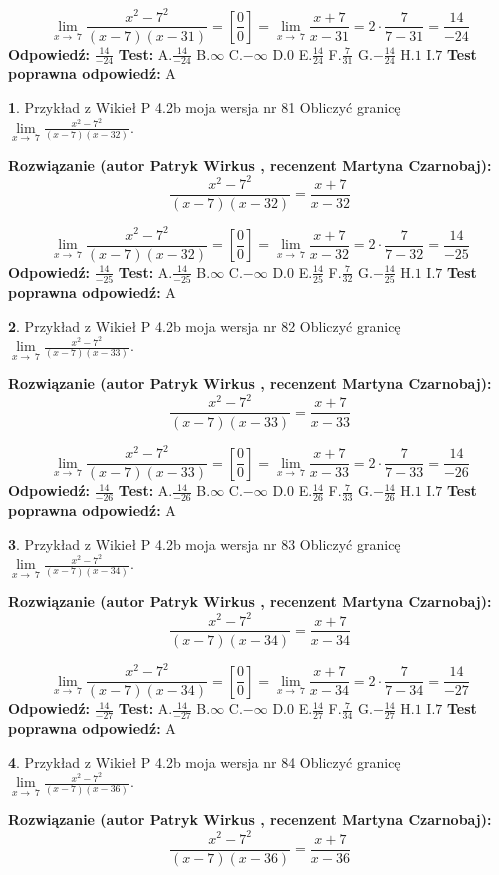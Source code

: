 \documentclass[12pt, a4paper]{article}
\theoremstyle{definition} %
\newtheorem{zad}{}
\newcommand{\zadStart}[1]{\begin{zad}#1\newline}
\newcommand{\zadStop}{\end{zad}}
\newcommand{\rozwStart}[2]{\noindent \textbf{Rozwiązanie (autor #1 , recenzent #2): }\newline}
\newcommand{\rozwStop}{\newline}
\newcommand{\odpStart}{\noindent \textbf{Odpowiedź:}\newline}
\newcommand{\odpStop}{\newline}
\newcommand{\testStart}{\noindent \textbf{Test:}\newline}
\newcommand{\testStop}{\newline}
\newcommand{\kluczStart}{\noindent \textbf{Test poprawna odpowiedź:}\newline}
\newcommand{\kluczStop}{\newline}
\begin{document}
$$\lim\limits_{x\to\ 7}\frac{x^{2}-7^{2}}{(x-7)(x-31)}=[\frac{0}{0}]=\lim\limits_{x\to\ 7}\frac{x+7}{x-31}=2 \cdot \frac{7}{7-31} = \frac{14}{-24}$$
\rozwStop
\odpStart
$\frac{14}{-24}$
\odpStop
\testStart
A.$\frac{14}{-24}$
B.$\infty$
C.$-\infty$
D.$0$
E.$\frac{14}{24}$
F.$\frac{7}{31}$
G.$-\frac{14}{24}$
H.$1$
I.$7$
\testStop
\kluczStart
A
\kluczStop



\zadStart{Przykład z Wikieł P 4.2b moja wersja nr 81}
Obliczyć granicę $\lim\limits_{x\to\ 7}\frac{x^{2}-7^{2}}{(x-7)(x-32)}$.
\zadStop
\rozwStart{Patryk Wirkus}{Martyna Czarnobaj}
$$\frac{x^{2}-7^{2}}{(x-7)(x-32)}=\frac{x+7}{x-32}$$

$$\lim\limits_{x\to\ 7}\frac{x^{2}-7^{2}}{(x-7)(x-32)}=[\frac{0}{0}]=\lim\limits_{x\to\ 7}\frac{x+7}{x-32}=2 \cdot \frac{7}{7-32} = \frac{14}{-25}$$
\rozwStop
\odpStart
$\frac{14}{-25}$
\odpStop
\testStart
A.$\frac{14}{-25}$
B.$\infty$
C.$-\infty$
D.$0$
E.$\frac{14}{25}$
F.$\frac{7}{32}$
G.$-\frac{14}{25}$
H.$1$
I.$7$
\testStop
\kluczStart
A
\kluczStop



\zadStart{Przykład z Wikieł P 4.2b moja wersja nr 82}
Obliczyć granicę $\lim\limits_{x\to\ 7}\frac{x^{2}-7^{2}}{(x-7)(x-33)}$.
\zadStop
\rozwStart{Patryk Wirkus}{Martyna Czarnobaj}
$$\frac{x^{2}-7^{2}}{(x-7)(x-33)}=\frac{x+7}{x-33}$$

$$\lim\limits_{x\to\ 7}\frac{x^{2}-7^{2}}{(x-7)(x-33)}=[\frac{0}{0}]=\lim\limits_{x\to\ 7}\frac{x+7}{x-33}=2 \cdot \frac{7}{7-33} = \frac{14}{-26}$$
\rozwStop
\odpStart
$\frac{14}{-26}$
\odpStop
\testStart
A.$\frac{14}{-26}$
B.$\infty$
C.$-\infty$
D.$0$
E.$\frac{14}{26}$
F.$\frac{7}{33}$
G.$-\frac{14}{26}$
H.$1$
I.$7$
\testStop
\kluczStart
A
\kluczStop



\zadStart{Przykład z Wikieł P 4.2b moja wersja nr 83}
Obliczyć granicę $\lim\limits_{x\to\ 7}\frac{x^{2}-7^{2}}{(x-7)(x-34)}$.
\zadStop
\rozwStart{Patryk Wirkus}{Martyna Czarnobaj}
$$\frac{x^{2}-7^{2}}{(x-7)(x-34)}=\frac{x+7}{x-34}$$

$$\lim\limits_{x\to\ 7}\frac{x^{2}-7^{2}}{(x-7)(x-34)}=[\frac{0}{0}]=\lim\limits_{x\to\ 7}\frac{x+7}{x-34}=2 \cdot \frac{7}{7-34} = \frac{14}{-27}$$
\rozwStop
\odpStart
$\frac{14}{-27}$
\odpStop
\testStart
A.$\frac{14}{-27}$
B.$\infty$
C.$-\infty$
D.$0$
E.$\frac{14}{27}$
F.$\frac{7}{34}$
G.$-\frac{14}{27}$
H.$1$
I.$7$
\testStop
\kluczStart
A
\kluczStop



\zadStart{Przykład z Wikieł P 4.2b moja wersja nr 84}
Obliczyć granicę $\lim\limits_{x\to\ 7}\frac{x^{2}-7^{2}}{(x-7)(x-36)}$.
\zadStop
\rozwStart{Patryk Wirkus}{Martyna Czarnobaj}
$$\frac{x^{2}-7^{2}}{(x-7)(x-36)}=\frac{x+7}{x-36}$$
\end{document}
